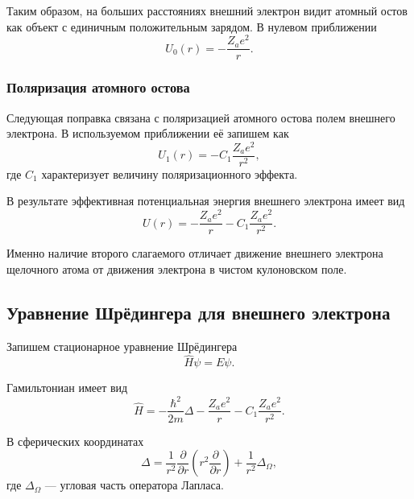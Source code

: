 \documentclass[../final.tex]{subfiles}
\begin{document}
Таким образом, на больших расстояниях внешний электрон видит атомный остов
как объект с единичным положительным зарядом. В нулевом приближении
\begin{equation*}
    U_0(r)
    =
    -\frac{Z_a e^2}{r}.
\end{equation*}

\subsubsection{Поляризация атомного остова}

Следующая поправка связана с поляризацией атомного остова полем внешнего
электрона. В используемом приближении её запишем как
\begin{equation*}
    U_1(r)
    =
    -C_1\frac{Z_a e^2}{r^2},
\end{equation*}
где \(C_1\) характеризует величину поляризационного эффекта.

В результате эффективная потенциальная энергия внешнего электрона имеет вид
\begin{equation*}
    \boxed{
        U(r)
        =
        -\frac{Z_a e^2}{r}
        -
        C_1\frac{Z_a e^2}{r^2}
    }.
\end{equation*}

Именно наличие второго слагаемого отличает движение внешнего электрона
щелочного атома от движения электрона в чистом кулоновском поле.

\subsection{Уравнение Шрёдингера для внешнего электрона}

Запишем стационарное уравнение Шрёдингера
\begin{equation*}
    \hat H\psi=E\psi.
\end{equation*}

Гамильтониан имеет вид
\begin{equation*}
    \hat H
    =
    -\frac{\hbar^2}{2m}\Delta
    -
    \frac{Z_a e^2}{r}
    -
    C_1\frac{Z_a e^2}{r^2}.
\end{equation*}

В сферических координатах
\begin{equation*}
    \Delta
    =
    \frac{1}{r^2}
    \frac{\partial}{\partial r}
    \left(
        r^2\frac{\partial}{\partial r}
    \right)
    +
    \frac{1}{r^2}\Delta_\Omega,
\end{equation*}
где \(\Delta_\Omega\) --- угловая часть оператора Лапласа.
\end{document}
